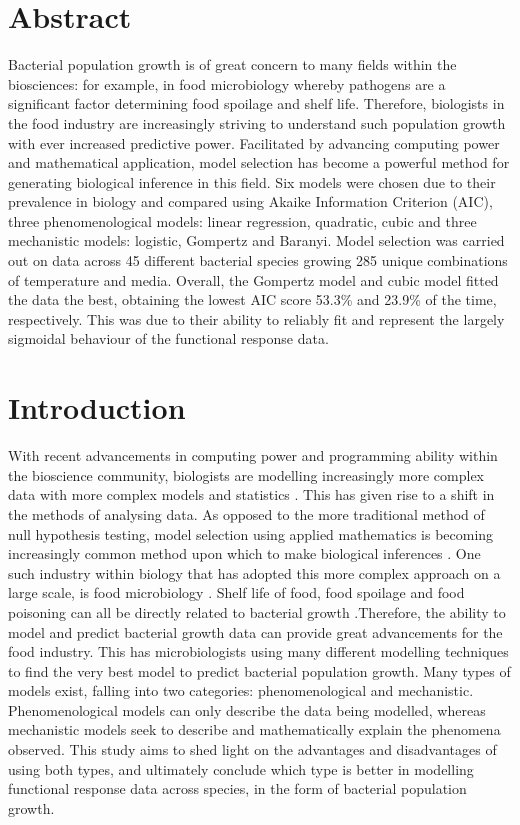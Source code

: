 \documentclass[11pt, a4paper]{article} %
\begin{document}
\linenumbers %
\linespread{2} %

\section{Abstract}

Bacterial population growth is of great concern to many fields within the biosciences: for example, in food microbiology whereby pathogens are a significant factor determining food spoilage and shelf life. Therefore, biologists in the food industry are increasingly striving to understand such population growth with ever increased predictive power. Facilitated by advancing computing power and mathematical application, model selection has become a powerful method for generating biological inference in this field. Six models were chosen due to their prevalence in biology and compared using Akaike Information Criterion (AIC), three phenomenological models: linear regression, quadratic, cubic and three mechanistic models: logistic, Gompertz and Baranyi. Model selection was carried out on data across 45 different bacterial species growing 285 unique combinations of temperature and media. Overall, the Gompertz model and cubic model fitted the data the best, obtaining the lowest AIC score 53.3\% and 23.9\% of the time, respectively. This was due to their ability to reliably fit and represent the largely sigmoidal behaviour of the functional response data.

\section{Introduction}

With recent advancements in computing power and programming ability within the bioscience community, biologists are modelling increasingly more complex data with more complex models and statistics \citep{RN69, RN107}. This has given rise to a shift in the methods of analysing data. As opposed to the more traditional method of null hypothesis testing, model selection using applied mathematics is becoming increasingly common method upon which to make biological inferences \citep{RN68}. One such industry within biology that has adopted this more complex approach on a large scale, is food microbiology \citep{RN108, RN105}. Shelf life of food, food spoilage and food poisoning can all be directly related to bacterial growth \citep{RN106}.Therefore, the ability to model and predict bacterial growth data can provide great advancements for the food industry. This has microbiologists using many different modelling techniques to find the very best model to predict bacterial population growth. Many types of models exist, falling into two categories: phenomenological and mechanistic. Phenomenological models can only describe the data being modelled, whereas mechanistic models seek to describe and mathematically explain the phenomena observed. This study aims to shed light on the advantages and disadvantages of using both types, and ultimately conclude which type is better in modelling functional response data across species, in the form of bacterial population growth.
\end{document}

